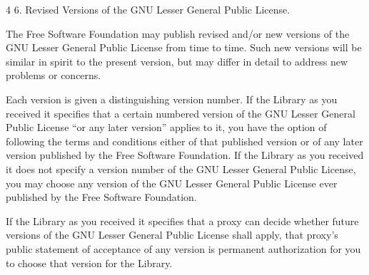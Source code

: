 \documentclass[fontsize=11pt,paper=A4,BCOR=12mm,DIV=13,open=any,listof=totoc,toc=flat]{scrbook}
\begin{document}
{\begin{multicols}{4}
6. Revised Versions of the GNU Lesser General Public License.

The Free Software Foundation may publish revised and/or new versions of the GNU Lesser General Public License from time to time. Such new versions will be similar in spirit to the present version, but may differ in detail to address new problems or concerns.

Each version is given a distinguishing version number. If the Library as you received it specifies that a certain numbered version of the GNU Lesser General Public License “or any later version” applies to it, you have the option of following the terms and conditions either of that published version or of any later version published by the Free Software Foundation. If the Library as you received it does not specify a version number of the GNU Lesser General Public License, you may choose any version of the GNU Lesser General Public License ever published by the Free Software Foundation.

If the Library as you received it specifies that a proxy can decide whether future versions of the GNU Lesser General Public License shall apply, that proxy's public statement of acceptance of any version is permanent authorization for you to choose that version for the Library.
\end{multicols}
}
\pagebreak
\end{document}
